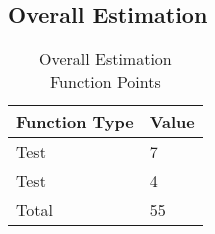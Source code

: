 \subsection{Overall Estimation}
\blindtext

\begin{table}[h!tb]
	\centering
	\caption{Overall Estimation Function Points}
	\label{tab:overall_fps}
	\begin{tabular}{|l|l|}
		\hline
		Function Type		&	Value	\\ \hline
		Test				&	7	\\
		Test				&	4	\\ \hline
		Total				&	55\\
		\hline
	\end{tabular}
\end{table}
